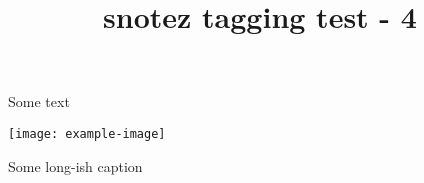 \documentclass{article}
\title{snotez tagging test - 4}
\begin{document}
Some text
\begin{sidefigure}
\texttt{[image: example-image]}
\caption{Some long-ish caption}
\end{sidefigure}
\end{document}
